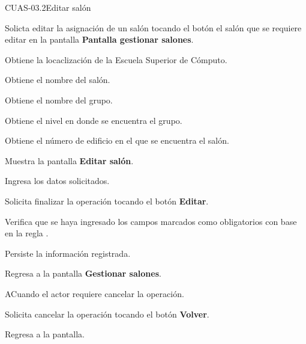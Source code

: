 \begin{UseCase}{CUAS-03.2}{Editar salón}
 \end{UseCase}

 \begin{UCtrayectoria}
    
    \UCpaso [\UCactor] Solicta editar la asignación de un salón tocando el botón el salón que se requiere editar en la pantalla \textbf{Pantalla gestionar salones}.
    
    \UCpaso Obtiene la locaclización de la Escuela Superior de Cómputo.
    
    \UCpaso Obtiene el nombre del salón.
    
    \UCpaso Obtiene el nombre del grupo.
    
    \UCpaso Obtiene el nivel en donde se encuentra el grupo.
    
    \UCpaso Obtiene el número de edificio en el que se encuentra el salón.
    
    \UCpaso Muestra la pantalla \textbf{Editar salón}.
    
    \UCpaso [\UCactor] Ingresa los datos solicitados.
    
    \UCpaso [\UCactor] Solicita finalizar la operación tocando el botón \textbf{Editar}. 
    
    \UCpaso Verifica que se haya ingresado los campos marcados como obligatorios con base en la regla .
    
    \UCpaso Persiste la información registrada.
    
    \UCpaso Regresa a la pantalla \textbf{Gestionar salones}.
    
\end{UCtrayectoria}

\begin{UCtrayectoriaA}{A}{Cuando el actor requiere cancelar la operación.}
	
	\UCpaso [\UCactor] Solicita cancelar la operación tocando el botón \textbf{Volver}.
	
	\UCpaso Regresa a la pantalla.
	
\end{UCtrayectoriaA}


